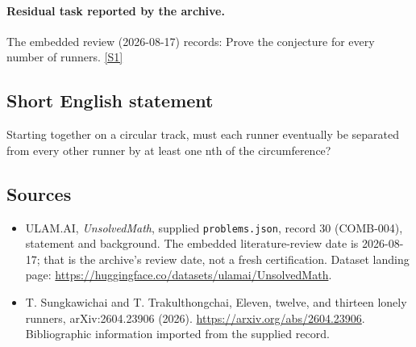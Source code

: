 \documentclass[11pt,a4paper]{article}
\newcommand{\sref}[2]{\hyperlink{source:#1:#2}{[S#2]}}
\begin{document}
\paragraph{Residual task reported by the archive.}

The embedded review (2026-08-17) records: Prove the conjecture for every number of runners. \sref{30}{1}

\subsection{Short English statement}

Starting together on a circular track, must each runner eventually be separated from every other runner by at least one nth of the circumference?

\subsection{Sources}

{\small

\begin{itemize}

\item[\hypertarget{source:30:1}{S1}] ULAM.AI, \emph{UnsolvedMath}, supplied \texttt{problems.json}, record 30 (COMB-004), statement and background. The embedded literature-review date is 2026-08-17; that is the archive’s review date, not a fresh certification. Dataset landing page: \url{https://huggingface.co/datasets/ulamai/UnsolvedMath}.

\item[\hypertarget{source:30:2}{S2}] T. Sungkawichai and T. Trakulthongchai, Eleven, twelve, and thirteen lonely runners, arXiv:2604.23906 (2026). \url{https://arxiv.org/abs/2604.23906}. Bibliographic information imported from the supplied record.

\end{itemize}

}

\label{end:30}
\end{document}
